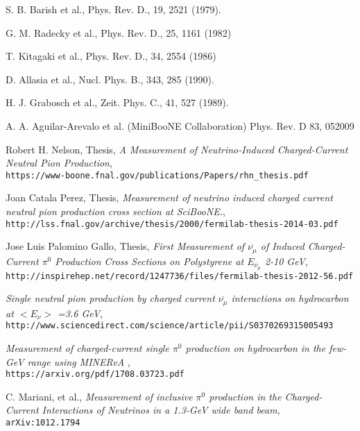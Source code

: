 \documentclass{article}
\begin{document}
\clearpage
\begin{thebibliography}{9}

  S. B. Barish et al., Phys. Rev. D., 19, 2521 (1979).

 G. M. Radecky et al., Phys. Rev. D., 25, 1161 (1982)
 
 T. Kitagaki et al., Phys. Rev. D., 34, 2554 (1986)
 
 D. Allasia et al., Nucl. Phys. B., 343, 285 (1990).

 H. J. Grabosch et al., Zeit. Phys. C., 41, 527 (1989).

  A. A. Aguilar-Arevalo et al. (MiniBooNE Collaboration)
Phys. Rev. D 83, 052009 

  Robert H. Nelson, Thesis, \emph{A Measurement of Neutrino-Induced Charged-Current Neutral Pion Production},\\
  \texttt{https://www-boone.fnal.gov/publications/Papers/rhn\_thesis.pdf}
  
  Joan Catala Perez, Thesis, \emph{Measurement of neutrino induced charged current neutral pion production cross section at SciBooNE.},\\
  \texttt{http://lss.fnal.gov/archive/thesis/2000/fermilab-thesis-2014-03.pdf}  

  Jose Luis Palomino Gallo, Thesis, \emph{First Measurement of $\overline{\nu_\mu}$ of Induced Charged-Current $\pi^0$ Production Cross Sections on Polystyrene at $E_{\overline{\nu_\mu}}$ 2-10 GeV},\\
  \texttt{http://inspirehep.net/record/1247736/files/fermilab-thesis-2012-56.pdf}  
  
   \emph{Single neutral pion production by charged current $\overline{\nu_\mu}$ interactions on hydrocarbon at $< E_\nu >$ =3.6 GeV},\\
  \texttt{http://www.sciencedirect.com/science/article/pii/S0370269315005493}  
  
   \emph{Measurement of charged-current single $\pi^0$ production on hydrocarbon in the few-GeV range using MINERvA },\\
  \texttt{https://arxiv.org/pdf/1708.03723.pdf}
  
  C. Mariani, et al., \emph{Measurement of inclusive $\pi^0$ production in the Charged-Current Interactions of Neutrinos in a 1.3-GeV wide band beam},\\
  \texttt{arXiv:1012.1794}


\end{thebibliography}
\end{document}
